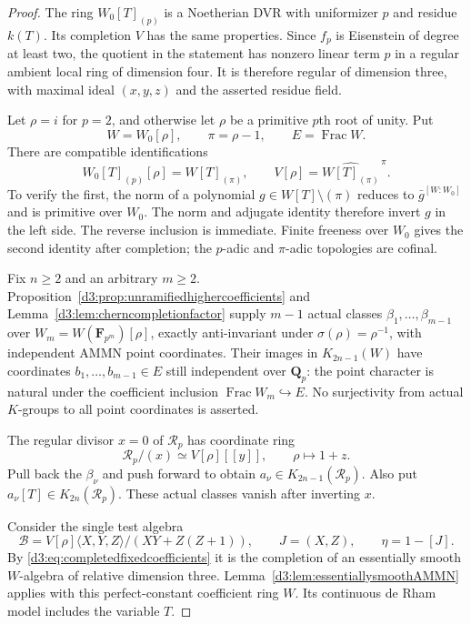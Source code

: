 \documentclass[11pt,a4paper]{amsart}
\numberwithin{equation}{section}
\theoremstyle{definition}
\theoremstyle{remark}
\newcommand{\Q}{\mathbf Q}
\newcommand{\F}{\mathbf F}
\newcommand{\Frac}{\operatorname{Frac}}
\begin{document}
\begin{proof}
The ring $W_0[T]_{(p)}$ is a Noetherian DVR with uniformizer
$p$ and residue $k(T)$. Its completion $V$ has the same
properties. Since $f_p$ is Eisenstein of degree at least two,
the quotient in the statement has nonzero linear term $p$
in a regular ambient local ring of dimension four.
It is therefore regular of dimension three, with maximal
ideal $(x,y,z)$ and the asserted residue field.

Let $\rho=i$ for $p=2$, and otherwise let $\rho$ be a primitive
$p$th root of unity. Put
\[
 W=W_0[\rho],\qquad \pi=\rho-1,\qquad E=\Frac W.
\]
There are compatible identifications
\begin{equation}\label{d3:eq:completedfixedcoefficients}
 W_0[T]_{(p)}[\rho]=W[T]_{(\pi)},\qquad
 V[\rho]=\widehat{W[T]_{(\pi)}}^{\,\pi}.
\end{equation}
To verify the first, the norm of a polynomial
$g\in W[T]\setminus(\pi)$ reduces to $\bar g^{[W:W_0]}$
and is primitive over $W_0$. The norm and adjugate identity
therefore invert $g$ in the left side. The reverse inclusion
is immediate. Finite freeness over $W_0$ gives the second
identity after completion; the $p$-adic and $\pi$-adic
topologies are cofinal.

Fix $n\geq2$ and an arbitrary $m\geq2$.
Proposition~\ref{d3:prop:unramifiedhighercoefficients} and
Lemma~\ref{d3:lem:cherncompletionfactor} supply $m-1$ actual
classes $\beta_1,\ldots,\beta_{m-1}$ over
$W_m=W(\F_{p^m})[\rho]$, exactly anti-invariant under
$\sigma(\rho)=\rho^{-1}$, with independent AMMN point
coordinates. Their images in $K_{2n-1}(W)$ have coordinates
$b_1,\ldots,b_{m-1}\in E$ still independent over $\Q_p$:
the point character is natural under the coefficient inclusion
$\Frac W_m\hookrightarrow E$.
No surjectivity from actual $K$-groups to all point coordinates
is asserted.

The regular divisor $x=0$ of $\mathcal R_p$ has coordinate ring
\[
 \mathcal R_p/(x)\simeq V[\rho][[y]],
 \qquad \rho\longmapsto1+z.
\]
Pull back the $\beta_\nu$ and push forward to obtain
$a_\nu\in K_{2n-1}(\mathcal R_p)$.
Also put $a_\nu[T]\in K_{2n}(\mathcal R_p)$.
These actual classes vanish after inverting $x$.

Consider the single test algebra
\[
 \mathcal B=V[\rho]\langle X,Y,Z\rangle/(XY+Z(Z+1)),
 \qquad J=(X,Z),\qquad\eta=1-[J].
\]
By \eqref{d3:eq:completedfixedcoefficients} it is the completion
of an essentially smooth $W$-algebra of relative dimension
three. Lemma~\ref{d3:lem:essentiallysmoothAMMN} applies with
this perfect-constant coefficient ring $W$.
Its continuous de Rham model includes the variable $T$.


\end{proof}
\end{document}
